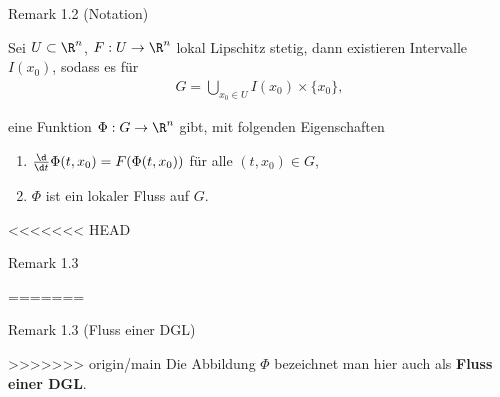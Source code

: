 \documentclass[letterpaper,10pt,english]{jupyterBook}
\begin{document}
\begin{emphBox}{}{}{Remark 1.2 (Notation)}
\begin{lemma}{}{}
\par
Sei \(U\subset\R^n\), \(F:U \rightarrow \R^n\) lokal Lipschitz stetig, dann existieren Intervalle \(I(x_0)\), sodass es für
\begin{align*}
G = \bigcup_{x_0\in U} I(x_0)\times\{x_0\},
\end{align*}
\par
eine Funktion \(\Phi:G\rightarrow \R^n\) gibt, mit folgenden Eigenschaften
\begin{enumerate}

\item {} 
\par
\(\frac{\d}{\d t} \Phi(t, x_0) = F(\Phi(t, x_0))\) für alle \((t,x_0)\in G\),

\item {} 
\par
\(\Phi\) ist ein lokaler Fluss auf \(G\).

\end{enumerate}
\end{lemma}
<<<<<<< HEAD
\label{ode/fluesse:remark-4}
\begin{emphBox}{}{}{Remark 1.3}



=======
\label{ode/fluesse:rem:fluss_dgl}
\begin{emphBox}{}{}{Remark 1.3 (Fluss einer DGL)}



\par
>>>>>>> origin/main
Die Abbildung \(\Phi\) bezeichnet man hier auch als \textbf{Fluss einer DGL}.
\end{emphBox}


\end{emphBox}
\end{emphBox}
\end{document}
